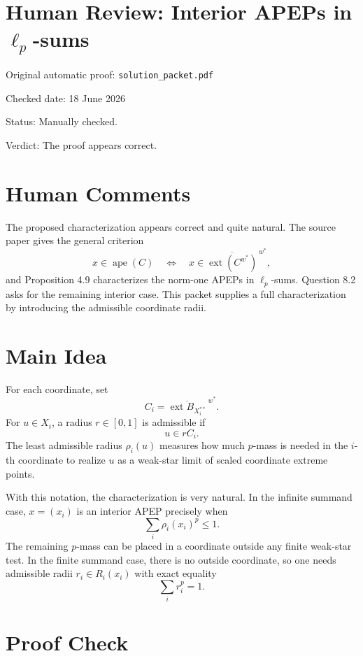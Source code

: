 \documentclass[11pt]{article}
\newcommand{\ext}{\operatorname{ext}}
\newcommand{\wstar}{w^*}
\begin{document}
\section*{Human Review: Interior APEPs in \texorpdfstring{$\ell_p$}{ell-p}-sums}

\noindent Original automatic proof: \texttt{solution\_packet.pdf}

\noindent Checked date: 18 June 2026

\noindent Status: Manually checked.

\noindent Verdict: The proof appears correct.

\section*{Human Comments}

The proposed characterization appears correct and quite natural.  The source
paper gives the general criterion
\[
  x\in \operatorname{ape}(C)
  \quad\Longleftrightarrow\quad
  x\in \overline{\ext(C^{\wstar})}^{\,\wstar},
\]
and Proposition 4.9 characterizes the norm-one APEPs in \(\ell_p\)-sums.
Question 8.2 asks for the remaining interior case.  This packet supplies a
full characterization by introducing the admissible coordinate radii.

\section*{Main Idea}

For each coordinate, set
\[
  C_i=\overline{\ext B_{X_i^{**}}}^{\,\wstar}.
\]
For \(u\in X_i\), a radius \(r\in[0,1]\) is admissible if
\[
  u\in r C_i.
\]
The least admissible radius \(\rho_i(u)\) measures how much \(p\)-mass is
needed in the \(i\)-th coordinate to realize \(u\) as a weak-star limit of
scaled coordinate extreme points.

With this notation, the characterization is very natural.  In the infinite
summand case, \(x=(x_i)\) is an interior APEP precisely when
\[
  \sum_i \rho_i(x_i)^p\leq 1.
\]
The remaining \(p\)-mass can be placed in a coordinate outside any finite
weak-star test.  In the finite summand case, there is no outside coordinate,
so one needs admissible radii \(r_i\in R_i(x_i)\) with exact equality
\[
  \sum_i r_i^p=1.
\]

\section*{Proof Check}
\end{document}
